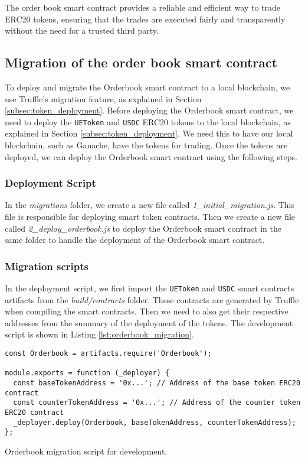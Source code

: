 The order book smart contract provides a reliable and efficient way to trade ERC20 tokens, ensuring that the trades are executed fairly and transparently without
the need for a trusted third party.


\subsection{Migration of the order book smart contract}


To deploy and migrate the Orderbook smart contract to a local blockchain, we use Truffle's migration feature, as explained in Section \ref{subsec:token_deployment}.
Before deploying the Orderbook smart contract, we need to deploy the \texttt{UEToken} and \texttt{USDC} ERC20 tokens to the local blockchain, as explained in
Section \ref{subsec:token_deployment}. We need this to have our local blockchain, such as Ganache, have the tokens for trading. Once the tokens are
deployed, we can deploy the Orderbook smart contract using the following steps.


\subsubsection{Deployment Script}


In the \textit{migrations} folder, we create a new file called \textit{1\_initial\_migration.js}. This file is responsible for deploying smart token contracts.
Then we create a new file called \textit{2\_deploy\_orderbook.js} to deploy the Orderbook smart contract in the same folder to handle the deployment of
the Orderbook smart contract.




\subsubsection{Migration scripts}


In the deployment script, we first import the \texttt{UEToken} and \texttt{USDC} smart contracts artifacts from the \textit{build/contracts} folder. These contracts
are generated by Truffle when compiling the smart contracts. Then we need to also get their respective addresses from the summary of the deployment of the tokens.
The development script is shown in Listing \ref{lst:orderbook_migration}.


\begin{listing}[H]
    \begin{verbatim}
const Orderbook = artifacts.require('Orderbook');

module.exports = function (_deployer) {
  const baseTokenAddress = '0x...'; // Address of the base token ERC20 contract
  const counterTokenAddress = '0x...'; // Address of the counter token ERC20 contract
  _deployer.deploy(Orderbook, baseTokenAddress, counterTokenAddress);
};
     \end{verbatim}
    \caption{Orderbook migration script for development.}
    \label{lst:orderbook_migration}
\end{listing}

